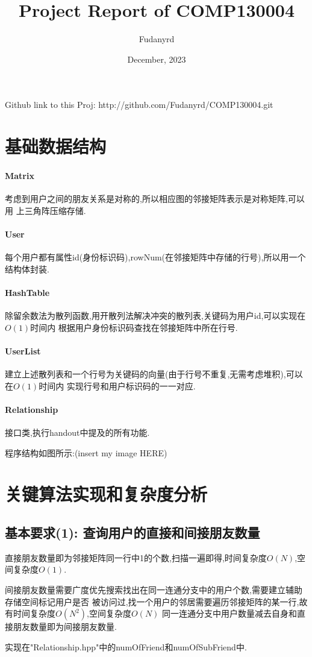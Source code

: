 \documentclass{article}
\title{Project Report of COMP130004}
\author{Fudanyrd}
\date{December, 2023}
\begin{document}
\begin{CJK*}{UTF8}{gbsn}
\maketitle
\par Github link to this Proj: http://github.com/Fudanyrd/COMP130004.git

\section{基础数据结构}

\paragraph{Matrix}
 考虑到用户之间的朋友关系是对称的,所以相应图的邻接矩阵表示是对称矩阵,可以用
上三角阵压缩存储.
\paragraph{User}
 每个用户都有属性id(身份标识码),rowNum(在邻接矩阵中存储的行号),所以用一个结构体封装.
\paragraph{HashTable}
除留余数法为散列函数,用开散列法解决冲突的散列表,关键码为用户id,可以实现在$O(1)$时间内
根据用户身份标识码查找在邻接矩阵中所在行号.
\paragraph{UserList}
建立上述散列表和一个行号为关键码的向量(由于行号不重复,无需考虑堆积),可以在$O(1)$时间内
实现行号和用户标识码的一一对应.
\paragraph{Relationship}
接口类,执行handout中提及的所有功能.
\par 程序结构如图所示:(insert my image HERE)

\section{关键算法实现和复杂度分析}
\subsection{基本要求(1): 查询用户的直接和间接朋友数量}
\par 直接朋友数量即为邻接矩阵同一行中1的个数,扫描一遍即得,时间复杂度$O(N)$,空间复杂度$O(1)$.
\par 间接朋友数量需要广度优先搜索找出在同一连通分支中的用户个数,需要建立辅助存储空间标记用户是否
被访问过,找一个用户的邻居需要遍历邻接矩阵的某一行,故有时间复杂度$O(N^2)$,空间复杂度$O(N)$
同一连通分支中用户数量减去自身和直接朋友数量即为间接朋友数量.
\par 实现在"Relationship.hpp"中的numOfFriend和numOfSubFriend中.

\end{CJK*}
\end{document}

